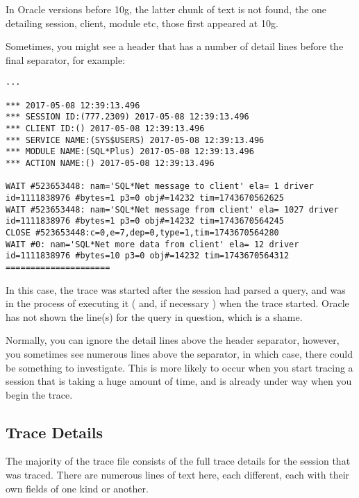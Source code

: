 In Oracle versions before 10g, the latter chunk of text is not found, the one detailing session, client, module etc, those first appeared at 10g.


\begin{note}
Sometimes, you might see a header that has a number of detail lines before the final separator, for example:

\begin{lstlisting}[numbers=none,caption={Oracle 11g Trace File Header - With Waits etc}]
...

*** 2017-05-08 12:39:13.496
*** SESSION ID:(777.2309) 2017-05-08 12:39:13.496
*** CLIENT ID:() 2017-05-08 12:39:13.496
*** SERVICE NAME:(SYS$USERS) 2017-05-08 12:39:13.496
*** MODULE NAME:(SQL*Plus) 2017-05-08 12:39:13.496
*** ACTION NAME:() 2017-05-08 12:39:13.496
 
WAIT #523653448: nam='SQL*Net message to client' ela= 1 driver id=1111838976 #bytes=1 p3=0 obj#=14232 tim=1743670562625
WAIT #523653448: nam='SQL*Net message from client' ela= 1027 driver id=1111838976 #bytes=1 p3=0 obj#=14232 tim=1743670564245
CLOSE #523653448:c=0,e=7,dep=0,type=1,tim=1743670564280
WAIT #0: nam='SQL*Net more data from client' ela= 12 driver id=1111838976 #bytes=10 p3=0 obj#=14232 tim=1743670564312
=====================
\end{lstlisting}

In this case, the trace was started after the session had parsed a query, and was in the process of executing it ( and, if necessary ) when the trace started. Oracle has not shown the  line(s) for the query in question, which is a shame.

Normally, you can ignore the detail lines above the header separator, however, you sometimes see numerous  lines above the separator, in which case, there could be something to investigate. This is more likely to occur when you start tracing a session that is taking a huge amount of time, and is already under way when you begin the trace.
\end{note}



\subsection{Trace Details}\label{trace-details}

The majority of the trace file consists of the full trace details for the session that was traced. There are numerous lines of text here, each different, each with their own fields of one kind or another.

